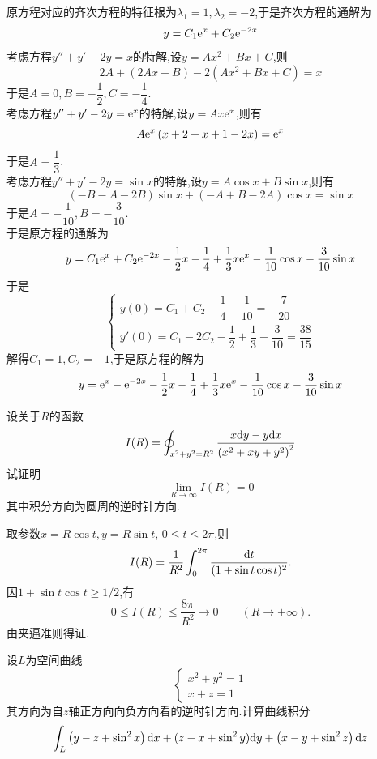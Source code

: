 \documentclass{ctexart}
\begin{document}
\begin{solution}
    原方程对应的齐次方程的特征根为$\lambda_1=1,\lambda_2=-2$,于是齐次方程的通解为
    \[y=C_1\mathrm{e}^{x}+C_2\mathrm{e}^{-2x}\]
    考虑方程$y''+y'-2y=x$的特解,设$y=Ax^2+Bx+C$,则
    \[2A+(2Ax+B)-2\left(Ax^2+Bx+C\right)=x\]
    于是$A=0,B=-\dfrac12,C=-\dfrac14$.\\
    考虑方程$y''+y'-2y=\mathrm{e}^x$的特解,设$y=Ax\mathrm{e}^x$,则有
    \[A\mathrm{e}^x\left(x+2+x+1-2x\right)=\mathrm{e}^x\]
    于是$A=\dfrac13$.\\
    考虑方程$y''+y'-2y=\sin x$的特解,设$y=A\cos x+B\sin x$,则有
    \[(-B-A-2B)\sin x+(-A+B-2A)\cos x=\sin x\]
    于是$A=-\dfrac{1}{10},B=-\dfrac{3}{10}$.\\
    于是原方程的通解为
    \[y=C_1\mathrm{e}^{x}+C_2\mathrm{e}^{-2x}-\dfrac12x-\dfrac14+\dfrac13x\mathrm{e}^x-\dfrac{1}{10}\cos x-\dfrac{3}{10}\sin x\]
    于是
    \[\left\{\begin{array}{l}
        y(0)=C_1+C_2-\dfrac14-\dfrac{1}{10}=-\dfrac{7}{20}\\
        y'(0)=C_1-2C_2-\dfrac12+\dfrac{1}{3}-\dfrac{3}{10}=\dfrac{38}{15}
    \end{array}\right.\]
    解得$C_1=1,C_2=-1$,于是原方程的解为
    \[y=\mathrm{e}^{x}-\mathrm{e}^{-2x}-\dfrac12x-\dfrac14+\dfrac13x\mathrm{e}^x-\dfrac{1}{10}\cos x-\dfrac{3}{10}\sin x\]

\end{solution}
\begin{problem}[4.(10\songti{分})]
    设关于$R$的函数
    \[I(R)=\oint_{x^2+y^2=R^2}\dfrac{x\mathrm{d} y-y\mathrm{d} x}{\left(x^2+xy+y^2\right)^2}\]
    试证明
    \[\lim_{R\to\infty}I(R)=0\]
    其中积分方向为圆周的逆时针方向.
\end{problem}
\begin{solution}
取参数$x=R\cos t,y=R\sin t$, $0\leqslant t\leqslant2\pi$,则
    \[I(R)=\dfrac1{R^2}\int_0^{2\pi}\dfrac{\mathrm{d} t}{(1+\sin t\cos t)^2}.\]
    因$1+\sin t\cos t\geqslant1/2$,有
    \[0\leqslant I(R)\leqslant\dfrac{8\pi}{R^2}\to0\qquad(R\to+\infty).\]
    由夹逼准则得证.
\end{solution}
\begin{problem}[5.(10\songti{分})]
    设$L$为空间曲线
    \[\left\{\begin{array}{l}
        x^2+y^2=1\\
        x+z=1
    \end{array}\right.\]
    其方向为自$z$轴正方向向负方向看的逆时针方向.计算曲线积分
    \[\int_{L}\left(y-z+\sin^2x\right)\mathrm{d} x+(z-x+\sin^2y)\mathrm{d} y+\left(x-y+\sin^2z\right)\mathrm{d} z\]

\end{problem}
\end{document}
